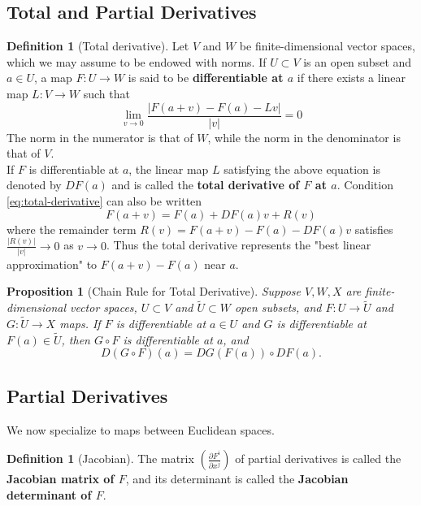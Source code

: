 \documentclass[reqno]{amsart}
\theoremstyle{plain}%
\newtheorem{proposition}[theorem]{Proposition}
\theoremstyle{definition}
\newtheorem{definition}[theorem]{Definition}
\theoremstyle{remark}
\begin{document}
    \subsection*{Total and Partial Derivatives}
        \begin{definition}[Total derivative]
        Let $V$ and $W$ be finite-dimensional vector spaces, which we may assume to
        be endowed with norms. If $U \subset V$ is an open subset and
        $a \in U$, a map $F  \colon U \to W$ is said to be \textbf{differentiable
        at $a$} if there exists a linear map $L  \colon V \to W$ such that
        \begin{equation}
        \lim_{v \to 0} \frac{\left| F(a+v) - F(a) - Lv \right| }{\left| v \right|
        }=0 \label{eq:total-derivative}
        \end{equation}
        The norm in the numerator is that of $W$, while the norm in the denominator
        is that of $V$.\\
        If $F$ is differentiable at $a$, the linear map $L$ satisfying the above
        equation is denoted by $DF(a)$ and is called the \textbf{total derivative
        of $F$ at $a$}. Condition \eqref{eq:total-derivative} can also be written
        \[
        F(a+v) = F(a) + DF(a)v + R(v)
        \] 
        where the remainder term $R(v) = F(a+v) - F(a) - DF(a)v$ satisfies
        $\frac{\left| R(v) \right| }{\left| v \right| }\to 0$ as $v \to 0$. Thus
        the total derivative represents the "best linear approximation" to
        $F(a+v) - F(a)$ near $a$.
        \end{definition}

        \begin{proposition}[Chain Rule for Total
        Derivative]\label{chain-rule-total-derivative}
        Suppose $V,W,X$ are finite-dimensional vector spaces, $U \subset V$ and
        $\tilde{U}\subset W$ open subsets, and $F  \colon U \to \tilde{U}$ and
        $G  \colon \tilde{U} \to X$ maps. If $F$ is differentiable at
        $a \in U$ and $G$ is differentiable at $F(a) \in \tilde{U}$, then
        $G \circ F$ is differentiable at $a$, and
        \[
        D\left( G \circ F \right) (a) = DG\left( F(a) \right) \circ DF(a).
        \] 
        \end{proposition}

    \subsection*{Partial Derivatives}
        We now specialize to maps between Euclidean spaces.
        \begin{definition}[Jacobian]
            The matrix $\left( \frac{\partial F^{i}}{\partial x^{j}} \right) $ of
            partial derivatives is called the \textbf{Jacobian matrix of $F$}, and its
            determinant is called the \textbf{Jacobian determinant of $F$}.
        \end{definition}
\end{document}
